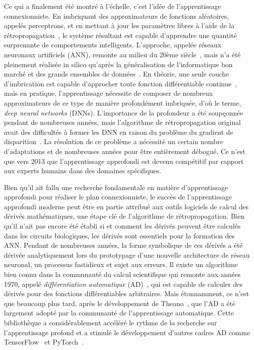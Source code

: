 Ce qui a finalement été montré à l'échelle, c'est l'idée de l'apprentissage connexionniste. En imbriquant des approximateurs de fonctions aléatoires, appelés perceptrons, et en mettant à jour les paramètres libres à l'aide de la rétropropagation~\citep{werbos1990backpropagation, rumelhart1988learning}, le système résultant est capable d'apprendre une quantité surprenante de comportements intelligents. L'approche, appelée réseaux neuronaux artificiels (ANN), remonte au milieu du 20ème siècle~\citep{ivakhnenko1965cybernetic, rosenblatt1958perceptron}, mais n'a été pleinement réalisée in silico qu'après la généralisation de l'informatique bon marché et des grands ensembles de données~\citep{lecun2015deep}. En théorie, une seule couche d'imbrication est capable d'approcher toute fonction différentiable continue~\citep{hornik1989multilayer}, mais en pratique, l'apprentissage nécessite de composer de nombreux approximateurs de ce type de manière profondément imbriquée, d'où le terme, \textit{deep neural networks} (DNNs). L'importance de la profondeur a été soupçonnée pendant de nombreuses années, mais l'algorithme de rétropropagation original avait des difficultés à former les DNN en raison du problème du gradient de disparition~\citep{bengio1994learning}. La résolution de ce problème a nécessité un certain nombre d'adaptations et de nombreuses années pour être entièrement débogué. Ce n'est que vers 2013 que l'apprentissage approfondi est devenu compétitif par rapport aux experts humains dans des domaines spécifiques.

Bien qu'il ait fallu une recherche fondamentale en matière d'apprentissage approfondi pour réaliser le plan connexionniste, le succès de l'apprentissage approfondi moderne peut être en partie attribué aux outils logiciels de calcul des dérivés mathématiques, une étape clé de l'algorithme de rétropropagation. Bien qu'il n'ait pas encore été établi si et comment les dérivés peuvent être calculés dans les circuits biologiques, les dérivés sont essentiels pour la formation des ANN. Pendant de nombreuses années, la forme symbolique de ces dérivés a été dérivée analytiquement lors du prototypage d'une nouvelle architecture de réseau neuronal, un processus fastidieux et sujet aux erreurs. Il existe un algorithme bien connu dans la communauté du calcul scientifique qui remonte aux années 1970, appelé \textit{différentiation automatique} (AD)~\citep{linnainmaa1970representation, griewank1989automatic}, qui est capable de calculer des dérivés pour des fonctions différentiables arbitraires. Mais étonnamment, ce n'est que beaucoup plus tard, après le développement de Theano~\citep{bergstra2010theano}, que l'AD a été largement adopté par la communauté de l'apprentissage automatique. Cette bibliothèque a considérablement accéléré le rythme de la recherche sur l'apprentissage profond et a stimulé le développement d'autres cadres AD comme TensorFlow~\citep{abadi2016tensorflow} et PyTorch~\citep{paszke2019pytorch}.

